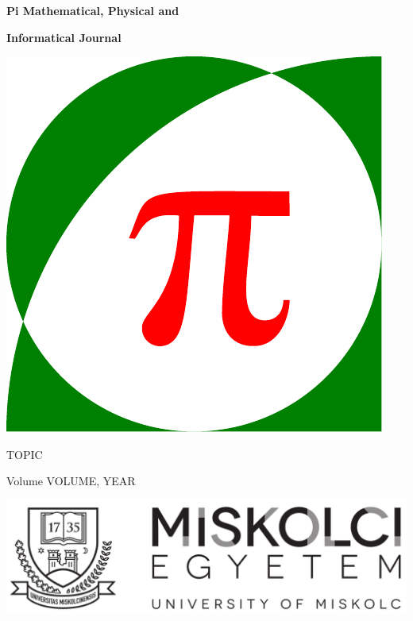 \documentclass[a4paper,12pt]{article}
\begin{document}
\begin{center}
	{\Huge \bf Pi Mathematical, Physical and}

	\vskip 3mm

	{\Huge \bf Informatical Journal}

	\vskip 2cm

	\includegraphics[scale=1.6]{jmathpi_logo.pdf}

	\vskip 1.5cm

	{\Huge TOPIC}
	
	\vskip 5mm

	{\Huge Volume VOLUME, YEAR}
	
	\vskip 1.5cm

	\includegraphics[scale=0.3]{me.png}

\end{center}

\vskip 1cm
\end{document}
